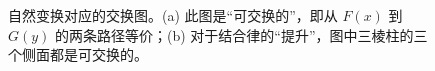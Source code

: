 \begin{figure}[htb]
  \centering
   \qquad
  \caption[自然变换对应的交换图]{自然变换对应的交换图。(a) 此图是“可交换的”，即从 $F(x)$ 到 $G(y)$ 的两条路径等价；(b) 对于结合律的“提升”，图中三棱柱的三个侧面都是可交换的。}
  \label{fig:natural-transformation}
\end{figure}




